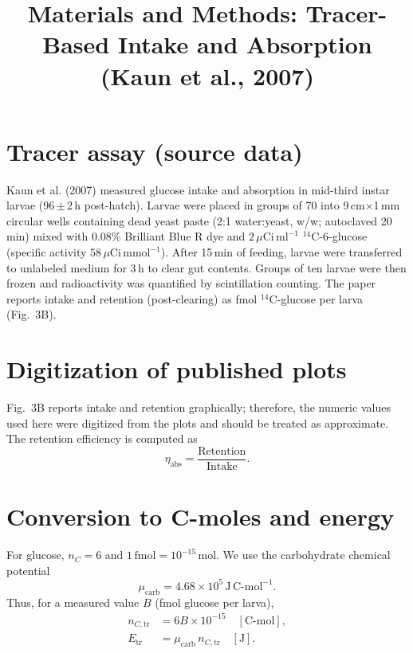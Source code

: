 \documentclass[11pt]{article}
\title{Materials and Methods: Tracer-Based Intake and Absorption (Kaun et al., 2007)}
\author{}
\date{}
\begin{document}
\maketitle

\section*{Tracer assay (source data)}
Kaun et al. (2007) measured glucose intake and absorption in mid-third instar larvae (96\,$\pm$\,2\,h post-hatch). Larvae were placed in groups of 70 into 9\,cm$\times$1\,mm circular wells containing dead yeast paste (2:1 water:yeast, w/w; autoclaved 20\,min) mixed with 0.08\% Brilliant Blue R dye and $2\,\mu\mathrm{Ci\,ml^{-1}}$ $^{14}$C-6-glucose (specific activity $58\,\mu\mathrm{Ci\,mmol^{-1}}$). After 15\,min of feeding, larvae were transferred to unlabeled medium for 3\,h to clear gut contents. Groups of ten larvae were then frozen and radioactivity was quantified by scintillation counting. The paper reports intake and retention (post-clearing) as fmol $^{14}$C-glucose per larva (Fig.~3B).

\section*{Digitization of published plots}
Fig.~3B reports intake and retention graphically; therefore, the numeric values used here were digitized from the plots and should be treated as approximate. The retention efficiency is computed as
\begin{equation}
  \eta_{\mathrm{abs}} = \frac{\text{Retention}}{\text{Intake}}.
\end{equation}

\section*{Conversion to C-moles and energy}
For glucose, $n_C=6$ and $1\,\mathrm{fmol}=10^{-15}\,\mathrm{mol}$. We use the carbohydrate chemical potential
\begin{equation}
  \mu_{\mathrm{carb}} = 4.68\times10^{5}\,\mathrm{J\,C\text{-}mol^{-1}}.
\end{equation}
Thus, for a measured value $B$ (fmol glucose per larva),
\begin{align}
  n_{C,\mathrm{tr}} &= 6B\times10^{-15}\quad [\mathrm{C\text{-}mol}],\\
  E_{\mathrm{tr}} &= \mu_{\mathrm{carb}}\,n_{C,\mathrm{tr}}\quad [\mathrm{J}].
\end{align}
\end{document}
